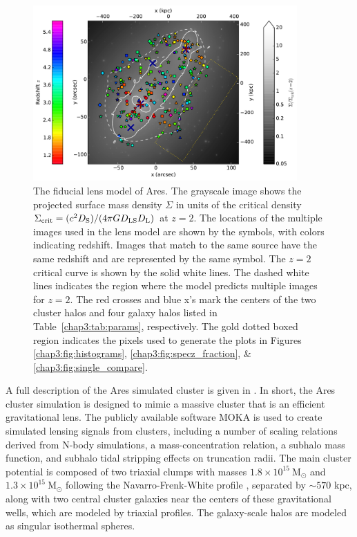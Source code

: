 \begin{figure}
\center
\includegraphics[width=0.9\textwidth]{Chap3/c3f2.pdf}
\caption[Surface mass density of Ares fiducial lens model]{The fiducial lens model of Ares. The grayscale image shows the projected surface mass density $\Sigma$ in units of the critical density $\Sigma_\mathrm{crit}=(c^2 D_\mathrm{S})/(4\pi G D_\mathrm{LS} D_\mathrm{L})$ at $z=2$. The locations of the multiple images used in the lens model are shown by the symbols, with colors indicating redshift. Images that match to the same source have the same redshift and are represented by the same symbol. The $z=2$ critical curve is shown by the solid white lines. The dashed white lines indicates the region where the model predicts multiple images for $z=2$. The red crosses and blue x's mark the centers of the two cluster halos and four galaxy halos listed in Table~\ref{chap3:tab:params}, respectively. The gold dotted boxed region indicates the pixels used to generate the plots in Figures~ \ref{chap3:fig:histograms},  \ref{chap3:fig:specz_fraction}, \&  \ref{chap3:fig:single_compare}.}
\label{chap3:fig:hst}
\end{figure}

A full description of the Ares simulated cluster is given in \citet{Meneghetti:2016xe}. In short, the Ares cluster simulation is designed to mimic a massive cluster that is an efficient gravitational lens. The publicly available software MOKA \citep{Giocoli:2012lr} is used to create simulated lensing signals from clusters, including a number of scaling relations derived from N-body simulations, a mass-concentration relation, a subhalo mass function, and subhalo tidal stripping effects on truncation radii. The main cluster potential is composed of two triaxial clumps with masses $1.8\times10^{15}\ \mathrm{M_\odot}$ and $1.3\times10^{15}\ \mathrm{M_\odot}$ following the Navarro-Frenk-White profile \citep[NFW;][]{Navarro:1997qa}, separated by $\sim570$ kpc, along with two central cluster galaxies near the centers of these gravitational wells, which are modeled by triaxial profiles. The galaxy-scale halos are modeled as singular isothermal spheres.

